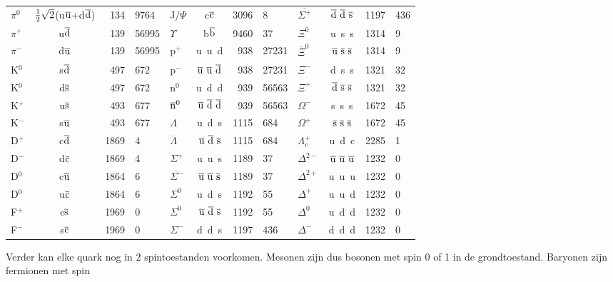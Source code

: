 \documentclass[twoside]{report}
\begin{document}
\begin{center}
\begin{tabular}{||l|cr@{,}l||l|cr@{,}l||l|cr@{,}l||}
\hline
$\pi^0$&$\mbox{$\frac{1}{2}$}\sqrt{2}$(u$\overline{\rm u}$+d$\overline{\rm d}$)&134&9764&J/$\Psi$&c$\overline{\rm c}$&3096&8&$\overline{\Sigma^+}$&$\overline{\rm d}~\overline{\rm d}~\overline{\rm s}$&1197&436\rule{0pt}{15pt}\\
$\pi^+$&u$\overline{\rm d}$&139&56995&$\Upsilon$&b$\overline{\rm b}$&9460&37 &$\Xi^0$&u~s~s&1314&9\\
\cline{5-8}
$\pi^-$&d$\overline{\rm u}$&139&56995&p$^+$&u~u~d&938&27231&$\overline{\Xi}^0$&$\overline{\rm u}~\overline{\rm s}~\overline{\rm s}$&1314&9\\
K$^0$&s$\overline{\rm d}$&497&672&p$^-$&$\overline{\rm u}~\overline{\rm u}~\overline{\rm d}$&938&27231&$\Xi^-$&d~s~s&1321&32\\
K$^0$&d$\overline{\rm s}$&497&672&n$^0$&u~d~d&939&56563&$\Xi^+$&$\overline{\rm d}~\overline{\rm s}~\overline{\rm s}$&1321&32\\
K$^+$&u$\overline{\rm s}$&493&677&$\overline{\rm n}^0$&$\overline{\rm u}~\overline{\rm d}~\overline{\rm d}$&939&56563&$\Omega^-$&s~s~s&1672&45\\
K$^-$&s$\overline{\rm u}$&493&677&$\Lambda$&u~d~s&1115&684&$\Omega^+$&$\overline{\rm s}~\overline{\rm s}~\overline{\rm s}$&1672&45\\
D$^+$&c$\overline{\rm d}$&1869&4&$\overline{\Lambda}$&$\overline{\rm u}~\overline{\rm d}~\overline{\rm s}$&1115&684&$\Lambda_c^+$&u~d~c&2285&1\\
D$^-$&d$\overline{\rm c}$&1869&4&$\Sigma^+$&u~u~s&1189&37&$\Delta^{2-}$&$\overline{\rm u}~\overline{\rm u}~\overline{\rm u}$&1232&0\\
D$^0$&c$\overline{\rm u}$&1864&6&$\overline{\Sigma^-}$&$\overline{\rm u}~\overline{\rm u}~\overline{\rm s}$&1189&37&$\Delta^{2+}$&u~u~u&1232&0\\
D$^0$&u$\overline{\rm c}$&1864&6&$\Sigma^0$&u~d~s&1192&55&$\Delta^+$&u~u~d&1232&0\\
F$^+$&c$\overline{\rm s}$&1969&0&$\Sigma^0$&$\overline{\rm u}~\overline{\rm d}~\overline{\rm s}$&1192&55&$\Delta^0$&u~d~d&1232&0\\
F$^-$&s$\overline{\rm c}$&1969&0&$\Sigma^-$&d~d~s&1197&436&$\Delta^-$&d~d~d&1232&0\\
\hline
\end{tabular}
\end{center}
Verder kan elke quark nog in 2 spintoestanden voorkomen. Mesonen zijn dus
bosonen met spin 0 of 1 in de grondtoestand. Baryonen zijn fermionen met spin
\end{document}
